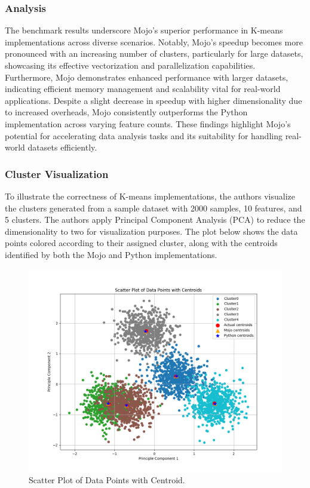 \documentclass[conference]{IEEEtran}
\begin{document}
\subsubsection{Analysis}
The benchmark results underscore Mojo's superior performance in K-means implementations across diverse scenarios. Notably, Mojo's speedup becomes more pronounced with an increasing number of clusters, particularly for large datasets, showcasing its effective vectorization and parallelization capabilities. Furthermore, Mojo demonstrates enhanced performance with larger datasets, indicating efficient memory management and scalability vital for real-world applications. Despite a slight decrease in speedup with higher dimensionality due to increased overheads, Mojo consistently outperforms the Python implementation across varying feature counts. These findings highlight Mojo's potential for accelerating data analysis tasks and its suitability for handling real-world datasets efficiently.

\subsubsection{Cluster Visualization}
To illustrate the correctness of K-means implementations, the authors visualize the clusters generated from a sample dataset with 2000 samples, 10 features, and 5 clusters. The authors apply Principal Component Analysis (PCA) to reduce the dimensionality to two for visualization purposes. The plot below shows the data points colored according to their assigned cluster, along with the centroids identified by both the Mojo and Python implementations.

\begin{figure}[h]
    \centerline{\includegraphics[width=\linewidth]{fig7.png}}
    \caption{Scatter Plot of Data Points with Centroid.}
    \label{fig7}
\end{figure}
\end{document}
